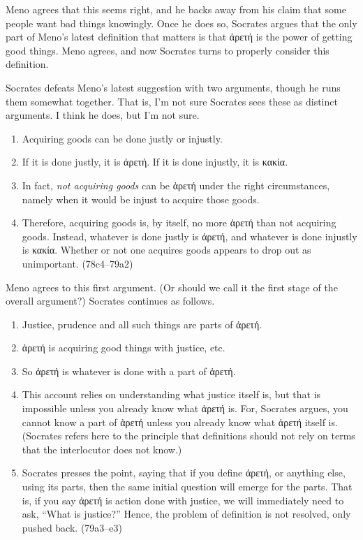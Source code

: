 \documentclass[12pt,letterpaper]{article}
\begin{document}
Meno agrees that this seems right, and he backs away from his claim that some people want bad things knowingly. Once he does so, Socrates argues that the only part of Meno's latest definition that matters is that \textgreek{ἀρετή} is the power of getting good things. Meno agrees, and now Socrates turns to properly consider this definition.

Socrates defeats Meno's latest suggestion with two arguments, though he runs them somewhat together. That is, I'm not sure Socrates sees these as distinct arguments. I think he does, but I'm not sure.

\begin{enumerate}
    \item Acquiring goods can be done justly or injustly.
    \item If it is done justly, it is \textgreek{ἀρετή}. If it is done injustly, it is \textgreek{κακία}.
    \item In fact, \textit{not acquiring goods} can be \textgreek{ἀρετή} under the right circumstances, namely when it would be injust to acquire those goods.
    \item Therefore, acquiring goods is, by itself, no more \textgreek{ἀρετή} than not acquiring goods. Instead, whatever is done justly is \textgreek{ἀρετή}, and whatever is done injustly is \textgreek{κακία}. Whether or not one acquires goods appears to drop out as unimportant. (78c4--79a2)
\end{enumerate}

Meno agrees to this first argument. (Or should we call it the first stage of the overall argument?) Socrates continues as follows.

\begin{enumerate}
    \item Justice, prudence and all such things are parts of \textgreek{ἀρετή}.
    \item \textgreek{ἀρετή} is acquiring good things with justice, etc.
    \item So \textgreek{ἀρετή} is whatever is done with a part of \textgreek{ἀρετή}.
    \item This account relies on understanding what justice itself is, but that is impossible unless you already know what \textgreek{ἀρετή} is. For, Socrates argues, you cannot know a part of \textgreek{ἀρετή} unless you already know what \textgreek{ἀρετή} itself is. (Socrates refers here to the principle that definitions should not rely on terms that the interlocutor does not know.)
    \item Socrates presses the point, saying that if you define \textgreek{ἀρετή}, or anything else, using its parts, then the same initial question will emerge for the parts. That is, if you say \textgreek{ἀρετή} is action done with justice, we will immediately need to ask, ``What is justice?'' Hence, the problem of definition is not resolved, only pushed back. (79a3--e3)
\end{enumerate}
\end{document}
